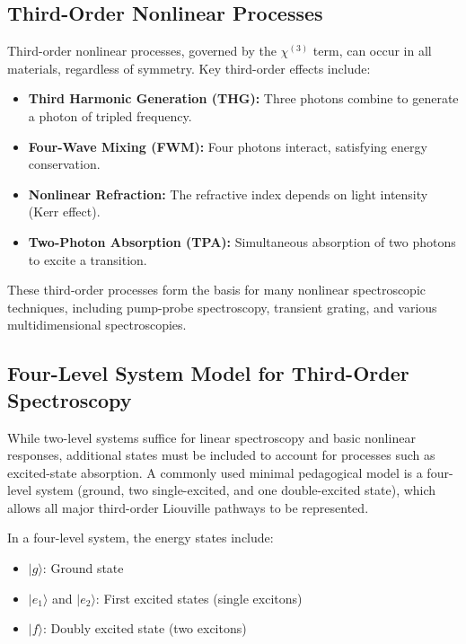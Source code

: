 \subsection{Third-Order Nonlinear Processes}
\label{subsec:third_order}

\noindent Third-order nonlinear processes, governed by the $\chi^{(3)}$ term, can occur in all materials, regardless of symmetry. Key third-order effects include:

\begin{itemize}
	\item \textbf{Third Harmonic Generation (THG):} Three photons combine to generate a photon of tripled frequency.
	\item \textbf{Four-Wave Mixing (FWM):} Four photons interact, satisfying energy conservation.
	\item \textbf{Nonlinear Refraction:} The refractive index depends on light intensity (Kerr effect).
	\item \textbf{Two-Photon Absorption (TPA):} Simultaneous absorption of two photons to excite a transition.
\end{itemize}

\noindent These third-order processes form the basis for many nonlinear spectroscopic techniques, including pump-probe spectroscopy, transient grating, and various multidimensional spectroscopies.

\subsection{Four-Level System Model for Third-Order Spectroscopy}
\label{subsec:four_level_model}

\noindent While two-level systems suffice for linear spectroscopy and basic nonlinear responses, additional states must be included to account for processes such as excited-state absorption. A commonly used minimal pedagogical model is a four-level system (ground, two single-excited, and one double-excited state), which allows all major third-order Liouville pathways to be represented\cite{cho2009twodimensionalopticalspectroscopy, abramaviciusetal2009coherentmultidimensionaloptical}.

\noindent In a four-level system, the energy states include:

\begin{itemize}
	\item $|g\rangle$: Ground state
	\item $|e_1\rangle$ and $|e_2\rangle$: First excited states (single excitons)
	\item $|f\rangle$: Doubly excited state (two excitons)
\end{itemize}

